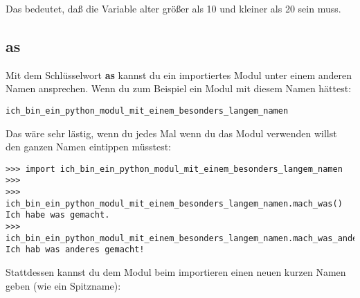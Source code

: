 \noindent
Das bedeutet, daß die Variable alter größer als 10 und kleiner als 20 sein muss.

\subsection*{as}

Mit dem Schlüsselwort \textbf{as} kannst du ein importiertes Modul unter einem anderen Namen ansprechen. Wenn du zum Beispiel ein Modul mit diesem Namen hättest:

\begin{Verbatim}[frame=single]
ich_bin_ein_python_modul_mit_einem_besonders_langem_namen
\end{Verbatim}

\noindent
Das wäre sehr lästig, wenn du jedes Mal wenn du das Modul verwenden willst den ganzen Namen eintippen müsstest:

\begin{Verbatim}[frame=single]
>>> import ich_bin_ein_python_modul_mit_einem_besonders_langem_namen
>>>
>>> ich_bin_ein_python_modul_mit_einem_besonders_langem_namen.mach_was()
Ich habe was gemacht.
>>> ich_bin_ein_python_modul_mit_einem_besonders_langem_namen.mach_was_anderes()
Ich hab was anderes gemacht!
\end{Verbatim}

\noindent
Stattdessen kannst du dem Modul beim importieren einen neuen kurzen Namen geben (wie ein Spitzname):

